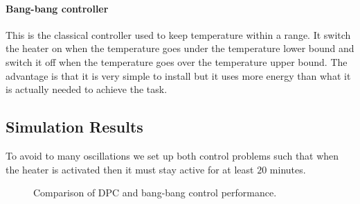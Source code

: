 \paragraph{Bang-bang controller}
This is the classical controller used to keep temperature within a range. It switch the heater on when the temperature goes under the temperature lower bound and switch it off when the temperature goes over the temperature upper bound. The advantage is that it is very simple to install but it uses more energy than what it is actually needed to achieve the task.
\subsection{Simulation Results} To avoid to many oscillations we set up both control problems such that when the heater is activated then it must stay active for at least $20$ minutes.

\begin{figure}[h!]
	\caption{Comparison of DPC and bang-bang control performance.}
	\captionsetup{justification=centering}
	\label{F:Comparison_small}
\end{figure}

